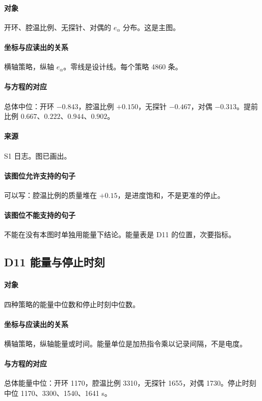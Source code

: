\paragraph{对象}
开环、腔温比例、无探针、对偶的 $e_\alpha$ 分布。这是主图。

\paragraph{坐标与应读出的关系}
横轴策略，纵轴 $e_\alpha$。零线是设计线。每个策略 4860 条。

\paragraph{与方程的对应}
总体中位：开环 $-0.843$，腔温比例 $+0.150$，无探针 $-0.467$，对偶 $-0.313$。提前比例 $0.667$、$0.222$、$0.944$、$0.902$。

\paragraph{来源}
S1 日志。图已画出。

\paragraph{该图位允许支持的句子}
可以写：腔温比例的质量堆在 $+0.15$，是进度饱和，不是更准的停止。

\paragraph{该图位不能支持的句子}
不能在没有本图时单独用能量下结论。能量表是 D11 的位置，次要指标。

\subsection{D11 能量与停止时刻}
\paragraph{对象}
四种策略的能量中位数和停止时刻中位数。

\paragraph{坐标与应读出的关系}
横轴策略，纵轴能量或时间。能量单位是加热指令乘以记录间隔，不是电度。

\paragraph{与方程的对应}
总体能量中位：开环 1170，腔温比例 3310，无探针 1655，对偶 1730。停止时刻中位 1170、3300、1540、1641 s。

